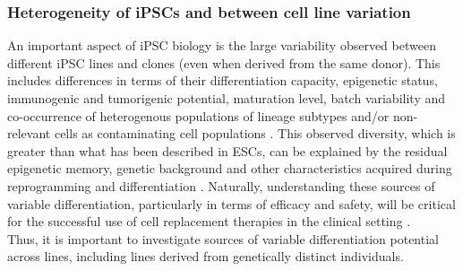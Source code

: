 




\subsubsection{Heterogeneity of iPSCs and between cell line variation}

An important aspect of iPSC biology is the  large variability observed between different iPSC lines and clones (even when derived from the same donor). 
This includes differences in terms of their differentiation capacity, epigenetic status, immunogenic and tumorigenic potential, maturation level, batch variability and co-occurrence of heterogenous populations of lineage subtypes and/or non-relevant cells as contaminating cell populations \cite{buganim2013mechanisms}.
This observed diversity, which is greater than what has been described in ESCs, can be explained by the residual epigenetic memory, genetic background and other characteristics acquired during reprogramming and differentiation \cite{kim2010epigenetic, polo2010cell, rouhani2014genetic}.
Naturally, understanding these sources of variable differentiation, particularly in terms of efficacy and safety, will be critical for the successful use of cell replacement therapies in the clinical setting \cite{buganim2013mechanisms}. \\

Thus, it is important to investigate sources of variable differentiation potential across lines, including lines derived from genetically distinct individuals.

